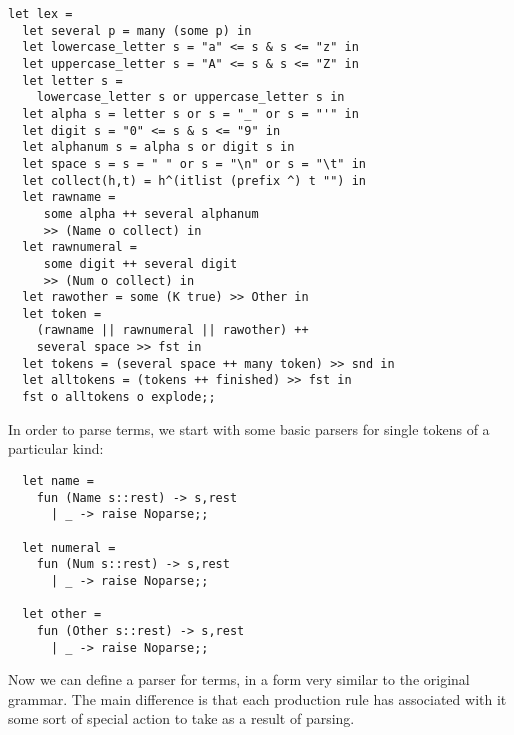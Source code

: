 \begin{slide*}


\vspace*{0.5cm}

\begin{black}\begin{footnotesize}\begin{verbatim}
let lex =
  let several p = many (some p) in
  let lowercase_letter s = "a" <= s & s <= "z" in
  let uppercase_letter s = "A" <= s & s <= "Z" in
  let letter s =
    lowercase_letter s or uppercase_letter s in
  let alpha s = letter s or s = "_" or s = "'" in
  let digit s = "0" <= s & s <= "9" in
  let alphanum s = alpha s or digit s in
  let space s = s = " " or s = "\n" or s = "\t" in
  let collect(h,t) = h^(itlist (prefix ^) t "") in
  let rawname =
     some alpha ++ several alphanum
     >> (Name o collect) in
  let rawnumeral =
     some digit ++ several digit
     >> (Num o collect) in
  let rawother = some (K true) >> Other in
  let token =
    (rawname || rawnumeral || rawother) ++
    several space >> fst in
  let tokens = (several space ++ many token) >> snd in
  let alltokens = (tokens ++ finished) >> fst in
  fst o alltokens o explode;;
\end{verbatim}\end{footnotesize}\end{black}

\end{slide*}


\begin{slide*}


\vspace*{0.5cm}

In order to parse terms, we start with some basic parsers for single tokens of
a particular kind:

\begin{black}\begin{verbatim}
  let name =
    fun (Name s::rest) -> s,rest
      | _ -> raise Noparse;;

  let numeral =
    fun (Num s::rest) -> s,rest
      | _ -> raise Noparse;;

  let other =
    fun (Other s::rest) -> s,rest
      | _ -> raise Noparse;;
\end{verbatim}\end{black}

Now we can define a parser for terms, in a form very similar to the original
grammar. The main difference is that each production rule has associated with
it some sort of special action to take as a result of parsing.

\end{slide*}



